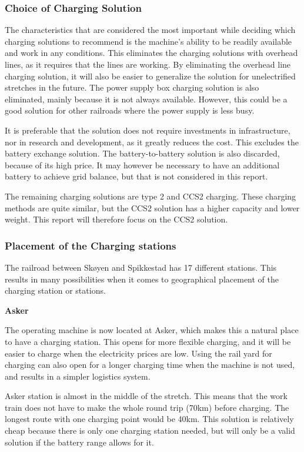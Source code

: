 \documentclass{article}
\begin{document}
\subsubsection*{Choice of Charging Solution}

The characteristics that are considered the most important while deciding which charging solutions to recommend is the machine’s ability to be readily available and work in any conditions. This eliminates the charging solutions with overhead lines, as it requires that the lines are working. By eliminating the overhead line charging solution, it will also be easier to generalize the solution for unelectrified stretches in the future. The power supply box charging solution is also eliminated, mainly because it is not always available. However, this could be a good solution for other railroads where the power supply is less busy.

It is preferable that the solution does not require investments in infrastructure, nor in research and development, as it greatly reduces the cost. This excludes the battery exchange solution. The battery-to-battery solution is also discarded, because of its high price. It may however be necessary to have an additional battery to achieve grid balance, but that is not considered in this report.

The remaining charging solutions are type 2 and CCS2 charging. These charging methods are quite similar, but the CCS2 solution has a higher capacity and lower weight. This report will therefore focus on the CCS2 solution.

\subsubsection*{Placement of the Charging stations}

The railroad between Skøyen and Spikkestad has 17 different stations. This results in many possibilities when it comes to geographical placement of the charging station or stations.

\textbf{Asker}

The operating machine is now located at Asker, which makes this a natural place to have a charging station. This opens for more flexible charging, and it will be easier to charge when the electricity prices are low. Using the rail yard for charging can also open for a longer charging time when the machine is not used, and results in a simpler logistics system.

Asker station is almost in the middle of the stretch. This means that the work train does not have to make the whole round trip (70km) before charging. The longest route with one charging point would be 40km. This solution is relatively cheap because there is only one charging station needed, but will only be a valid solution if the battery range allows for it.
\end{document}

